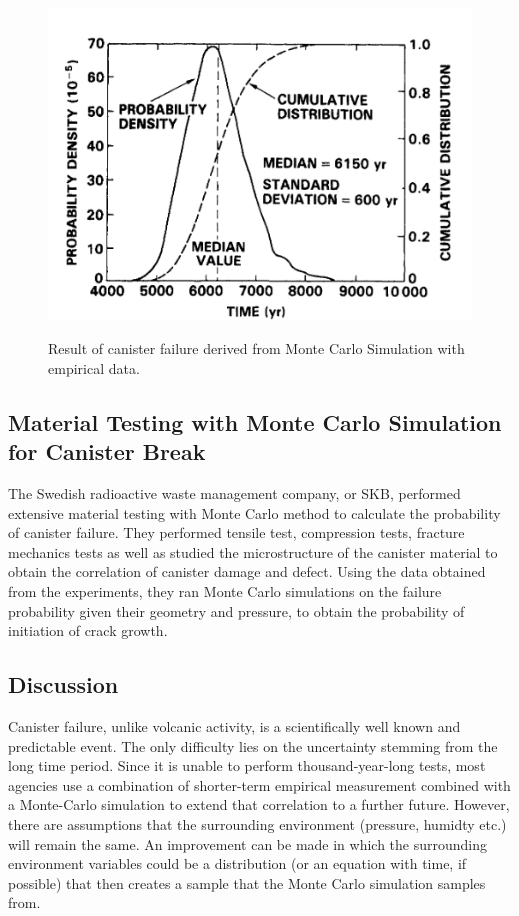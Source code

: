 \documentclass[12pt]{article}
\begin{document}
\begin{figure}[h]
\centering
\includegraphics[scale=0.5]{./images/canister.png}
\label{fig:can}
\caption{Result of canister failure derived from Monte Carlo Simulation
         with empirical data.}
\end{figure}


\subsection{Material Testing with Monte Carlo Simulation for Canister Break}
The Swedish radioactive waste management company, or \gls{SKB}, 
performed extensive material testing with Monte Carlo method
to calculate the probability of canister failure. They performed
tensile test, compression tests, fracture mechanics tests as well 
as studied the microstructure of the canister material to obtain
the correlation of canister damage and defect. Using the data 
obtained from the experiments, they ran Monte Carlo simulations
on the failure probability given their geometry and pressure, to
obtain the probability of initiation of crack growth. 

\subsection{Discussion}
Canister failure, unlike volcanic activity, is a scientifically well
known and predictable event. The only difficulty lies on the 
uncertainty stemming from the long time period. Since it is unable
to perform thousand-year-long tests, most agencies use a combination
of shorter-term empirical measurement combined with a Monte-Carlo 
simulation to extend that correlation to a further future. However,
there are assumptions that the surrounding environment (pressure, humidty etc.)
will remain the same. An improvement can be made in which the surrounding environment
variables could be a distribution (or an equation with time, if possible)
that then creates a sample that the Monte Carlo simulation samples from.
\end{document}
